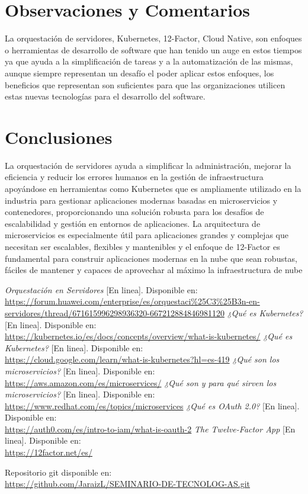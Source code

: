 \documentclass[12pt]{article}
\begin{document}
\section*{Observaciones y Comentarios}
La orquestación de servidores, Kubernetes, 12-Factor, Cloud Native, son enfoques o herramientas de desarrollo de software que han tenido un auge en estos tiempos ya que ayuda a la simplificación de tareas y a la automatización de las mismas, aunque siempre representan un desafío el poder aplicar estos enfoques, los beneficios que representan son suficientes para que las organizaciones utilicen estas nuevas tecnologías para el desarrollo del software.

\section*{Conclusiones}
La orquestación de servidores ayuda a simplificar la administración, mejorar la eficiencia y reducir los errores humanos en la gestión de infraestructura apoyándose en herramientas como Kubernetes que es ampliamente utilizado en la industria para gestionar aplicaciones modernas basadas en microservicios y contenedores, proporcionando una solución robusta para los desafíos de escalabilidad y gestión en entornos de aplicaciones. La arquitectura de microservicios es especialmente útil para aplicaciones grandes y complejas que necesitan ser escalables, flexibles y mantenibles y el enfoque de 12-Factor es fundamental para construir aplicaciones modernas en la nube que sean robustas, fáciles de mantener y capaces de aprovechar al máximo la infraestructura de nube


\begin{thebibliography}{9}
\textit{Orquestación en Servidores} [En linea]. Disponible en:\\ \url{https://forum.huawei.com/enterprise/es/orquestaci%25C3%25B3n-en-servidores/thread/671615996298936320-667212884846981120}
\textit{¿Qué es Kubernetes? }[En linea]. Disponible en:\\ \url{https://kubernetes.io/es/docs/concepts/overview/what-is-kubernetes/}
\textit{¿Qué es Kubernetes? }[En linea]. Disponible en:\\ \url{https://cloud.google.com/learn/what-is-kubernetes?hl=es-419}
\textit{¿Qué son los microservicios?} [En linea]. Disponible en:\\ \url{https://aws.amazon.com/es/microservices/}
\textit{¿Qué son y para qué sirven los microservicios?} [En linea]. Disponible en:\\ \url{https://www.redhat.com/es/topics/microservices}
\textit{¿Qué es OAuth 2.0?} [En linea]. Disponible en:\\ \url{https://auth0.com/es/intro-to-iam/what-is-oauth-2}
\textit{The Twelve-Factor App} [En linea]. Disponible en:\\ \url{https://12factor.net/es/}
\end{thebibliography}
Repositorio git disponible en:\\ \url{https://github.com/JaraizL/SEMINARIO-DE-TECNOLOG-AS.git}
\end{document}
